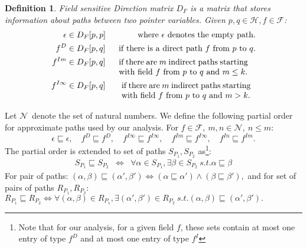 \documentclass{sig-alternate}
\newtheorem{definition}{Definition}
\newcommand{\p}{\ensuremath{p}}
\newcommand{\q}{\ensuremath{q}}
\newcommand{\drct}{\ensuremath{D}}
\newcommand{\indrct}{\ensuremath{I}}
\newcommand{\heap}{\ensuremath{\mathcal{H}}}
\newcommand{\fields}{\ensuremath{\mathcal{F}}}
\newcommand{\nat}{\ensuremath{\mathcal{N}}}
\newcommand{\DFM}[2]{\ensuremath{D_F[#1,#2]}}
\newcommand{\sub}[2]{\ensuremath{{#1}_{#2}}}
\begin{document}
\begin{definition}
\label{DFM_matrix}
Field sensitive Direction matrix
$\sub{D}{F}$ is a matrix that stores information 
about paths between two pointer variables.
Given $\p, \q \in
\heap, f \in \fields$:
\begin{eqnarray*}
  \epsilon & \in \DFM{p}{p}& \mbox{ where $\epsilon$
    denotes the empty path.} \\
  f^\drct  &\in  \DFM{p}{q} & \mbox{ if there is a direct
    path $f$ from $\p$ to $\q$.}\\
  f^{\indrct m} & \in  \DFM{p}{q} & 
  \mbox{\begin{tabular}[t]{p{55mm}}if there are $m$ indirect
      paths starting with field $f$ from $\p$ to $\q$ and $m
      \leq k.$
    \end{tabular}
  } \\
  f^{\indrct\infty} & \in  \DFM{p}{q} &
  \mbox{\begin{tabular}[t]{p{55mm}}if there are $m$ indirect
      paths starting with field $f$ from $\p$ to $\q$ and $m >
      k.$
  \end{tabular}}  
\end{eqnarray*}
\end{definition}

Let \nat\ denote the set of natural numbers. We define the
following partial order for approximate paths used by our
analysis. For $ f \in \fields,\ m,n \in \nat,\ n \leq m$:
$$
\epsilon \sqsubseteq \epsilon, \quad 
f^\drct \sqsubseteq  f^\drct,  \quad
f^{\indrct\infty}  \sqsubseteq  f^{\indrct\infty}, \quad
f^{\indrct m} \sqsubseteq f^{\indrct\infty}, \quad
f^{\indrct n} \sqsubseteq f^{\indrct m}. 
$$
The partial order is extended to set of paths $S_{P_1},
S_{P_2}$ as\footnote{Note that for our analysis, for a given
  field $f$, these sets contain at most one entry of type
  $f^\drct$ and at most one entry of type $f^\indrct$}:
\begin{eqnarray*}
  S_{P_1} \sqsubseteq S_{P_2} &\Leftrightarrow& \forall \alpha \in
  S_{P_1}, \exists \beta \in S_{P_2}\ s.t. \alpha \sqsubseteq \beta
\end{eqnarray*}
For pair of paths:
$  (\alpha, \beta) \sqsubseteq (\alpha', \beta') 
  \Leftrightarrow 
   (\alpha \sqsubseteq \alpha')  \wedge
  (\beta \sqsubseteq  \beta'), $
and for set of pairs of paths $R_{P_1}, R_{P_2}$:
  $R_{P_1} \sqsubseteq R_{P_2} \Leftrightarrow \forall
  (\alpha, \beta) \in
  R_{P_1}, \exists (\alpha', \beta') \in
  R_{P_2}\ s.t. (\alpha, \beta) \sqsubseteq (\alpha', \beta').$
\end{document}
